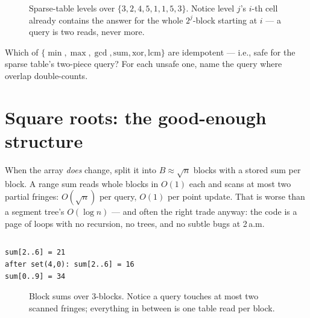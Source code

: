 \begin{figure}[ht]\centering

\caption{Sparse-table levels over $\{3,2,4,5,1,1,5,3\}$. Notice level
$j$'s $i$-th cell already contains the answer for the whole
$2^j$-block starting at $i$ --- a query is two reads, never more.}
\label{fig:sparse}
\end{figure}

\begin{exercise}[medium]\label{exr:idem}
Which of $\{\min, \max, \gcd, \mathrm{sum}, \mathrm{xor},
\mathrm{lcm}\}$ are idempotent --- i.e., safe for the sparse table's
two-piece query? For each unsafe one, name the query where overlap
double-counts.
\end{exercise}

\section{Square roots: the good-enough structure}\label{sec:sqrt}

When the array \emph{does} change, split it into $B \approx \sqrt n$
blocks with a stored sum per block. A range sum reads whole blocks in
$O(1)$ each and scans at most two partial fringes: $O(\sqrt n)$ per
query, $O(1)$ per point update. That is worse than a segment tree's
$O(\log n)$ --- and often the right trade anyway: the code is a page
of loops with no recursion, no trees, and no subtle bugs at 2\,a.m.

\begin{lstlisting}[language=C++,caption={\texttt{sqrtdec.h}: block sums
plus point updates.},label={lst:sqrtdec}]
\end{lstlisting}


\begin{lstlisting}[numbers=none,caption={\texttt{sqrt\_sum.cpp} real
output.},label={lst:sqrtout}]
sum[2..6] = 21
after set(4,0): sum[2..6] = 16
sum[0..9] = 34
\end{lstlisting}

\begin{figure}[ht]\centering

\caption{Block sums over 3-blocks. Notice a query touches at most two
scanned fringes; everything in between is one table read per block.}
\label{fig:sqrt}
\end{figure}

